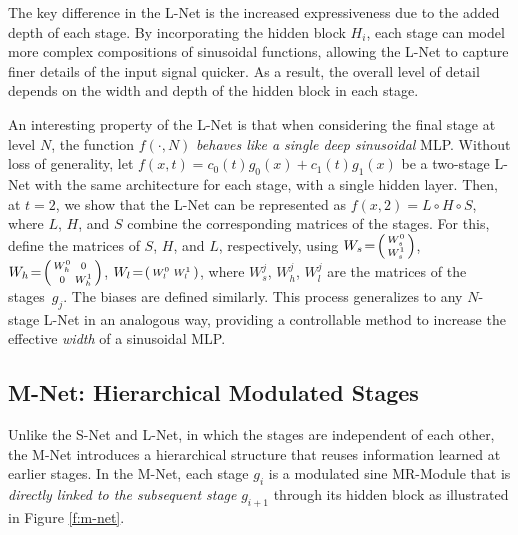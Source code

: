 The key difference in the L-Net is the increased expressiveness due to the added depth of each stage. By incorporating the hidden block \( H_i \), each stage can model more complex compositions of sinusoidal functions, allowing the L-Net to capture finer details of the input signal quicker. As a result, the overall level of detail depends on the width and depth of the hidden block in each stage. 


An interesting property of the L-Net is that when considering the final stage at level \( N \), the function \( f(\cdot, N) \) \textit{behaves like a single deep sinusoidal} MLP. Without loss of generality, let \( f(x, t) = c_0(t)g_0(x) + c_1(t)g_1(x) \) be a two-stage L-Net with the same architecture for each stage, with a single hidden layer. Then, at \( t = 2 \), we show that the L-Net can be represented as \( f(x, 2) = L \circ H \circ S \), where \( L \), \( H \), and \( S \) combine the corresponding matrices of the stages. For this, define the matrices of $S$, $H$, and $L$, respectively, using $W_s\!=\!\begin{psmallmatrix}W_s^0\\W_s^1\end{psmallmatrix}$, 
$W_h\!=\!\begin{psmallmatrix}W_h^0& 0\\0&W_h^1\end{psmallmatrix}$, 
$W_l\!=\!\begin{psmallmatrix}W_l^0 & W_l^1\end{psmallmatrix}$, where $W_s^j$, $W_h^j$, $W_l^j$ are the matrices of the stages~$g_j$. The biases are defined similarly. This process generalizes to any \( N \)-stage L-Net in an analogous way, providing a controllable method to increase the effective \textit{width} of a sinusoidal MLP.

\subsection{M-Net: Hierarchical Modulated Stages}
\label{s-mnet}

Unlike the S-Net and L-Net, in which the stages are independent of each other, the M-Net introduces a hierarchical structure that reuses information learned at earlier stages. In the M-Net, each stage \( g_i \) is a modulated sine MR-Module that is \textit{directly linked to the subsequent stage} \( g_{i+1} \) through its hidden block as illustrated in Figure \ref{f:m-net}.

